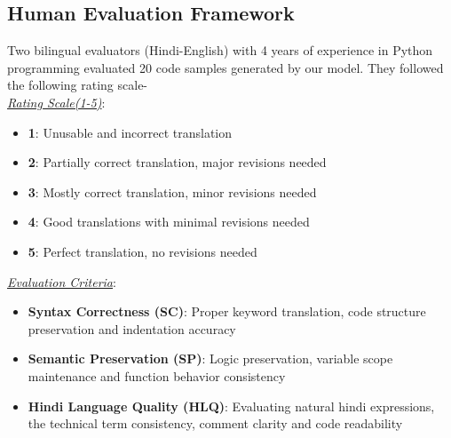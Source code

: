 \documentclass[11pt,a4paper]{article}
\begin{document}
\subsection{Human Evaluation Framework}
Two bilingual evaluators (Hindi-English) with 4 years of experience in Python programming evaluated 20 code samples generated by our model. They followed the following rating scale-\\ 
\textit{\underline{Rating Scale(1-5)}}:
\begin{itemize}[itemsep=0pt, topsep=0pt]
    \item \textbf{1}: Unusable and incorrect translation
    \item \textbf{2}: Partially correct translation, major revisions needed
    \item \textbf{3}: Mostly correct translation, minor revisions needed
    \item \textbf{4}: Good translations with minimal revisions needed
    \item \textbf{5}: Perfect translation, no revisions needed
\end{itemize}
\textit{\underline{Evaluation Criteria}}:
\begin{itemize}[itemsep=0pt, topsep=0pt]
    \item \textbf{Syntax Correctness (SC)}: Proper keyword translation, code structure preservation and indentation accuracy
    \item \textbf{Semantic Preservation (SP)}: Logic preservation, variable scope maintenance and function behavior consistency
    \item \textbf{Hindi Language Quality (HLQ)}: Evaluating natural hindi expressions, the technical term consistency, comment clarity and code readability
\end{itemize}
\end{document}
